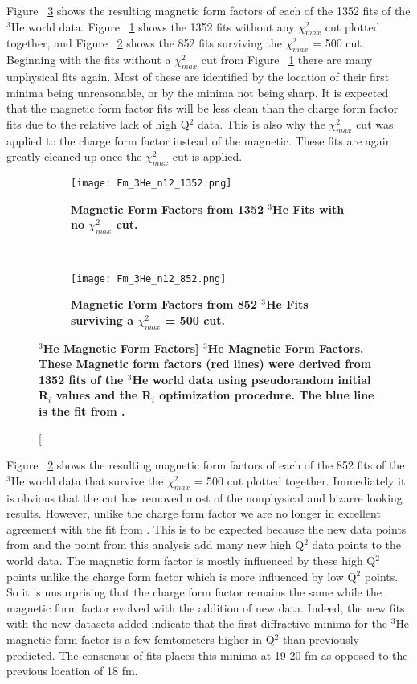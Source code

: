 Figure ~\ref{fig:3he_fm} shows the resulting magnetic form factors of each of the 1352 fits of the $^3$He world data. Figure ~\ref{fig:3he_fm_no_cut} shows the 1352 fits without any $\chi^2_{max}$ cut plotted together, and Figure ~\ref{fig:3he_fm_cut} shows the 852 fits surviving the $\chi^2_{max}$ = 500 cut. Beginning with the fits without a $\chi^2_{max}$ cut from Figure ~\ref{fig:3he_fm_no_cut} there are many unphysical fits again. Most of these are identified by the location of their first minima being unreasonable, or by the minima not being sharp. It is expected that the magnetic form factor fits will be less clean than the charge form factor fits due to the relative lack of high Q$^2$ data. This is also why the $\chi^2_{max}$ cut was applied to the charge form factor instead of the magnetic. These fits are again greatly cleaned up once the $\chi^2_{max}$ cut is applied.

\begin{figure}[!ht]
\begin{subfigure}{1.\textwidth}
  \centering
  \texttt{[image: Fm\_3He\_n12\_1352.png]}
  \caption{\bf{Magnetic Form Factors from 1352 $^3$He Fits with no $\chi^2_{max}$ cut.}}
  \label{fig:3he_fm_no_cut}
\end{subfigure}\\
\begin{subfigure}{1.\textwidth}
  \centering
  \texttt{[image: Fm\_3He\_n12\_852.png]}
  \caption{\bf{Magnetic Form Factors from 852 $^3$He Fits surviving a $\chi^2_{max}$ = 500 cut.}}
  \label{fig:3he_fm_cut}
\end{subfigure}
\caption[\bf{$^3$He Magnetic Form Factors}] {
{\bf{$^3$He Magnetic Form Factors.}} These Magnetic form factors (red lines) were derived from 1352 fits of the $^3$He world data using pseudorandom initial R$_i$ values and the R$_i$ optimization procedure. The blue line is the fit from \cite{Article:Amroun}.}
\label{fig:3he_fm}
\end{figure}

Figure ~\ref{fig:3he_fm_cut} shows the resulting magnetic form factors of each of the 852 fits of the $^3$He world data that survive the $\chi^2_{max}$ = 500 cut plotted together. Immediately it is obvious that the cut has removed most of the nonphysical and bizarre looking results. However, unlike the charge form factor we are no longer in excellent agreement with the fit from \cite{Article:Amroun}. This is to be expected because the new data points from \cite{Article:Alex} and the point from this analysis add many new high Q$^2$ data points to the world data. The magnetic form factor is mostly influenced by these high Q$^2$ points unlike the charge form factor which is more influenced by low Q$^2$ points. So it is unsurprising that the charge form factor remains the same while the magnetic form factor evolved with the addition of new data. Indeed, the new fits with the new datasets added indicate that the first diffractive minima for the $^3$He magnetic form factor is a few femtometers higher in Q$^2$ than previously predicted. The consensus of fits places this minima at 19-20 fm as opposed to the previous location of 18 fm.  

